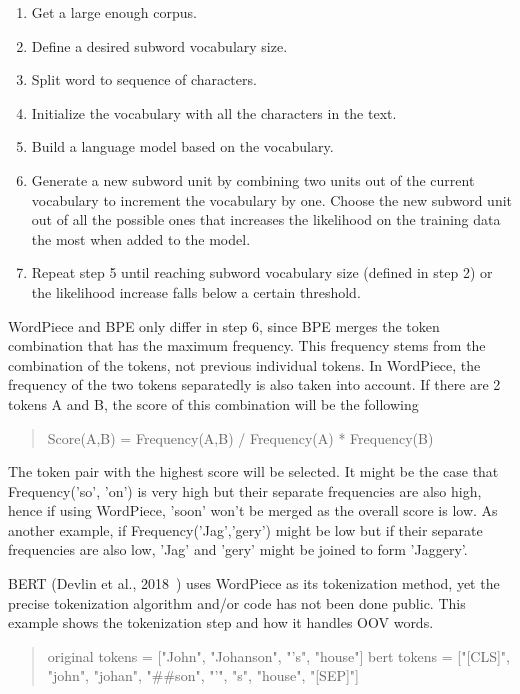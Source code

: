 \begin{enumerate}
    \item Get a large enough corpus.
    \item Define a desired subword vocabulary size.
    \item Split word to sequence of characters.
    \item Initialize the vocabulary with all the characters in the text.
    \item Build a language model based on the vocabulary.
    \item Generate a new subword unit by combining two units out of the current vocabulary to increment the vocabulary by one. Choose the new subword unit out of all the possible ones that increases the likelihood on the training data the most when added to the model.
    \item Repeat step 5 until reaching subword vocabulary size (defined in step 2) or the likelihood increase falls below a certain threshold.
\end{enumerate}

WordPiece and BPE only differ in step 6, since BPE merges the token combination that has the maximum frequency. This frequency stems from the combination of the tokens, not previous individual tokens. In WordPiece, the frequency of the two tokens separatedly is also taken into account. If there are 2 tokens A and B, the score of this combination will be the following

\begin{quote}
    Score(A,B) = Frequency(A,B) / Frequency(A) * Frequency(B)
\end{quote}

The token pair with the highest score will be selected. It might be the case that Frequency('so', 'on') is very high but their separate frequencies are also high, hence if using WordPiece, 'soon' won't be merged as the overall score is low. As another example, if Frequency('Jag','gery') might be low but if their separate frequencies are also low, 'Jag' and 'gery' might be joined to form 'Jaggery'.

BERT (Devlin et al., 2018~\cite{devlin2018bert}) uses WordPiece as its tokenization method, yet the precise tokenization algorithm and/or code has not been done public. This example shows the tokenization step and how it handles OOV words.

\begin{quote}
    original tokens = ["John", "Johanson", "'s",  "house"]
    bert tokens = ["[CLS]", "john", "johan", "\#\#son", "'", "s", "house", "[SEP]"]
\end{quote}

